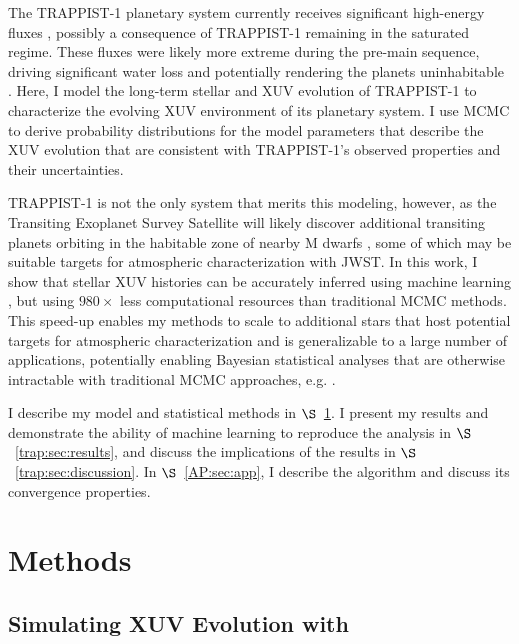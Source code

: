 The TRAPPIST-1 planetary system currently receives significant high-energy fluxes \citep{Bourrier2017b,Wheatley2017,Peacock2019}, possibly a consequence of TRAPPIST-1 remaining in the saturated regime. These fluxes were likely more extreme during the pre-main sequence, driving significant water loss and potentially rendering the planets uninhabitable \citep{Bolmont2017,Bourrier2017a}. Here, I model the long-term stellar and XUV evolution of TRAPPIST-1 to characterize the evolving XUV environment of its planetary system. I use MCMC to derive probability distributions for the model parameters that describe the XUV evolution that are consistent with TRAPPIST-1's observed properties and their uncertainties.

TRAPPIST-1 is not the only system that merits this modeling, however, as the Transiting Exoplanet Survey Satellite will likely discover additional transiting planets orbiting in the habitable zone of nearby M dwarfs \citep{Barclay2018}, some of which may be suitable targets for atmospheric characterization with JWST. In this work, I show that stellar XUV histories can be accurately inferred using machine learning \citep[\approxposterior, ][]{FlemingVanderPlas2018}, but using $980\times$ less computational resources than traditional MCMC methods. This speed-up enables my methods to scale to additional stars that host potential targets for atmospheric characterization and is generalizable to a large number of applications, potentially enabling Bayesian statistical analyses that are otherwise intractable with traditional MCMC approaches, e.g. \emcee \citep{ForemanMackey2013}.

I describe my model and statistical methods in $\S$~\ref{trap:sec:methods}. I present my results and demonstrate the ability of machine learning to reproduce the analysis in $\S$~\ref{trap:sec:results}, and discuss the implications of the results in $\S$~\ref{trap:sec:discussion}. In $\S$~\ref{AP:sec:app}, I describe the \approxposterior algorithm and discuss its convergence properties.

\section{Methods} \label{trap:sec:methods}

\subsection{Simulating XUV Evolution with \vplanet} \label{trap:sec:model}

